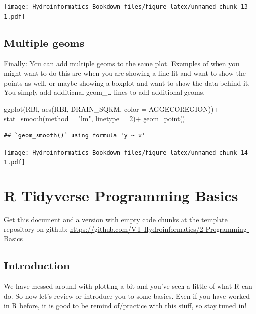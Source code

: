 \documentclass[
]{book}
\newenvironment{Shaded}{\begin{snugshade}}{\end{snugshade}}
\newcommand{\AttributeTok}[1]{\textcolor[rgb]{0.77,0.63,0.00}{#1}}
\newcommand{\DecValTok}[1]{\textcolor[rgb]{0.00,0.00,0.81}{#1}}
\newcommand{\FunctionTok}[1]{\textcolor[rgb]{0.00,0.00,0.00}{#1}}
\newcommand{\NormalTok}[1]{#1}
\newcommand{\SpecialCharTok}[1]{\textcolor[rgb]{0.00,0.00,0.00}{#1}}
\newcommand{\StringTok}[1]{\textcolor[rgb]{0.31,0.60,0.02}{#1}}
\begin{document}
\texttt{[image: Hydroinformatics\_Bookdown\_files/figure-latex/unnamed-chunk-13-1.pdf]}

\hypertarget{multiple-geoms}{%
\section{Multiple geoms}\label{multiple-geoms}}

Finally: You can add multiple geoms to the same plot. Examples of when you might want to do this are when you are showing a line fit and want to show the points as well, or maybe showing a boxplot and want to show the data behind it. You simply add additional geom\_\ldots{} lines to add additional geoms.

\begin{Shaded}
\begin{Highlighting}[]
\FunctionTok{ggplot}\NormalTok{(RBI, }\FunctionTok{aes}\NormalTok{(RBI, DRAIN\_SQKM, }\AttributeTok{color =}\NormalTok{ AGGECOREGION))}\SpecialCharTok{+}
  \FunctionTok{stat\_smooth}\NormalTok{(}\AttributeTok{method =} \StringTok{"lm"}\NormalTok{, }\AttributeTok{linetype =} \DecValTok{2}\NormalTok{)}\SpecialCharTok{+}
  \FunctionTok{geom\_point}\NormalTok{()}
\end{Highlighting}
\end{Shaded}

\begin{verbatim}
## `geom_smooth()` using formula 'y ~ x'
\end{verbatim}

\texttt{[image: Hydroinformatics\_Bookdown\_files/figure-latex/unnamed-chunk-14-1.pdf]}

\hypertarget{Programming}{%
\chapter{R Tidyverse Programming Basics}\label{Programming}}

Get this document and a version with empty code chunks at the template repository on github: \url{https://github.com/VT-Hydroinformatics/2-Programming-Basics}

\hypertarget{introduction-1}{%
\section{Introduction}\label{introduction-1}}

We have messed around with plotting a bit and you've seen a little of what R can do. So now let's review or introduce you to some basics. Even if you have worked in R before, it is good to be remind of/practice with this stuff, so stay tuned in!
\end{document}
